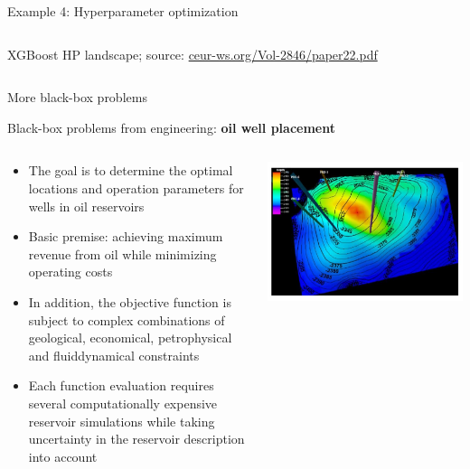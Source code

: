 \documentclass[11pt,compress,t,notes=noshow, xcolor=table]{beamer}
\begin{document}
\begin{vbframe}{Example 4: Hyperparameter optimization}
\begin{columns}
\begin{column}{0.35\textwidth}
\begin{center}
\begin{tiny}{XGBoost HP landscape; source: \url{ceur-ws.org/Vol-2846/paper22.pdf}}\end{tiny}
		\end{center}
  \end{column}
\end{columns}
\end{vbframe}



\begin{vbframe}{More black-box problems}

Black-box problems from engineering: \textbf{oil well placement}
\vspace*{-0.1cm}
\begin{columns}
	\begin{column}{0.65\textwidth}
		\begin{itemize}
			\item The goal is to determine the optimal locations and operation parameters for wells in oil reservoirs
			\item Basic premise: achieving maximum revenue from oil while minimizing operating costs
			\item In addition, the objective function is subject to complex combinations of geological, economical, petrophysical and fluiddynamical constraints 
			\item Each function evaluation requires several computationally expensive reservoir simulations while taking uncertainty in the reservoir description into account 
		\end{itemize}
	\end{column}
	\begin{column}{0.35\textwidth}
		\begin{center}
			\includegraphics{figure_man/oil_well_problem.jpg}

\end{center}
\end{column}
\end{columns}
\end{vbframe}
\end{document}
